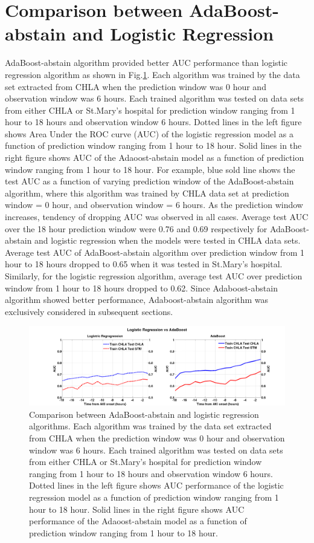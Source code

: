 \documentclass[
   technote
]{phildoc}
\newcommand{\fig}{Fig.}
\begin{document}
\section{Comparison between AdaBoost-abstain and Logistic Regression}
\label{sec:lr_ab_compare} 
AdaBoost-abstain algorithm provided better AUC performance than logistic regression algorithm as shown in \fig \ref{fig:lrVSab}. Each algorithm was trained by the data set extracted from CHLA when the prediction window was 0 hour and observation window was 6 hours. Each trained algorithm was tested on data sets from either CHLA or St.Mary's hospital for prediction window ranging from 1 hour to 18 hours and observation window 6 hours. Dotted lines in the left figure shows Area Under the ROC curve (AUC) of the logistic regression model as a function of prediction window ranging from 1 hour to 18 hour. Solid lines in the right figure shows AUC of the Adaoost-abstain model as a function of prediction window ranging from 1 hour to 18 hour. For example, blue sold line shows the test AUC as a function of varying prediction window of the AdaBoost-abstain algorithm, where this algorithm was trained by CHLA data set at prediction window = 0 hour, and observation window = 6 hours. As the prediction window increases, tendency of dropping AUC was observed in all cases. Average test AUC over the 18 hour prediction window were 0.76 and 0.69 respectively for AdaBoost-abstain and logistic regression when the models were tested in CHLA data sets. Average test AUC of AdaBoost-abstain algorithm over prediction window from 1 hour to 18 hours dropped to 0.65 when it was tested in St.Mary's hospital. Similarly, for the logistic regression algorithm, average test AUC over prediction window from 1 hour to 18 hours dropped to 0.62. Since Adaboost-abstain algorithm showed better performance, Adaboost-abstain algorithm was exclusively considered in subsequent sections.

\begin{figure}[!htbp]
\centering
\includegraphics[width=\textwidth]{./figures/lrVSab_twin006.png}
\caption{Comparison between AdaBoost-abstain and logistic regression algorithms. Each algorithm was trained by the data set extracted from CHLA when the prediction window was 0 hour and observation window was 6 hours. Each trained algorithm was tested on data sets from either CHLA or St.Mary's hospital for prediction window ranging from 1 hour to 18 hours and observation window 6 hours. Dotted lines in the left figure shows AUC performance of the logistic regression model as a function of prediction window ranging from 1 hour to 18 hour. Solid lines in the right figure shows AUC performance of the Adaoost-abstain model as a function of prediction window ranging from 1 hour to 18 hour.} 
\label{fig:lrVSab}      
\end{figure}
\end{document}
